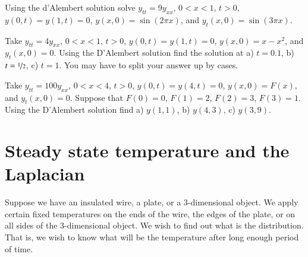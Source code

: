 \setcounter{exercise}{100}

\begin{exercise}
Using the d'Alembert solution solve $y_{tt} = 9y_{xx}$, $0 < x < 1$, $t >
0$,
$y(0,t) = y(1, t) = 0$, $y(x,0) = \sin (2 \pi x)$, and
$y_t(x,0) = \sin (3 \pi x)$.
\end{exercise}

\begin{exercise}
Take $y_{tt} = 4y_{xx}$, $0 < x < 1$, $t > 0$,
$y(0,t) = y(1, t) = 0$, $y(x,0) = x-x^2$, and
$y_t(x,0) = 0$.  Using the D'Alembert solution find
the solution at a) $t=0.1$,
b) $t=\nicefrac{1}{2}$, c) $t=1$.  You may have to split your answer up
by cases.
\end{exercise}

\begin{exercise}
Take $y_{tt} = 100y_{xx}$, $0 < x < 4$, $t > 0$,
$y(0,t) = y(4, t) = 0$, $y(x,0) = F(x)$, and
$y_t(x,0) = 0$.  Suppose that
$F(0)=0$,
$F(1)=2$,
$F(2)=3$,
$F(3)=1$.
Using the D'Alembert solution find
a) $y(1,1)$,
b) $y(4,3)$,
c) $y(3,9)$.
\end{exercise}


\sectionnewpage
\section{Steady state temperature and the Laplacian}
\label{dirich:section}


Suppose we have an insulated wire, a plate, or a 3-dimensional object.
We apply
certain fixed temperatures on the ends of the wire, the edges of the plate,
or on all sides of the 3-dimensional object.  We wish to find out what is the
\emph{} distribution.  That is, we wish to know what will
be the temperature after long enough period of time.

